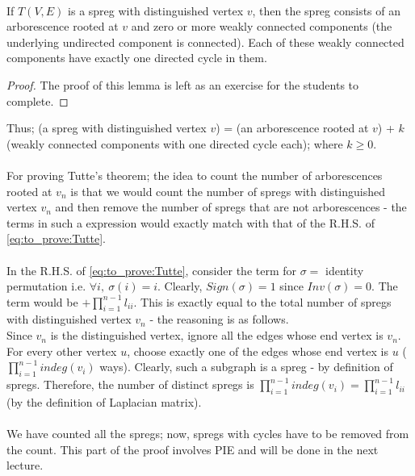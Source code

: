\noindent\\
\begin{lemma} If $T(V,E)$ is a spreg with distinguished vertex $v$, then the spreg consists of an arborescence rooted at $v$ and zero or more weakly connected components (the underlying undirected component is connected). Each of these weakly connected components have exactly one directed cycle in them.
\end{lemma}
\begin{proof}
The proof of this lemma is left as an exercise for the students to complete.
\end{proof}
\noindent Thus; (a spreg  with distinguished vertex $v$) = (an arborescence rooted at $v$) + $k$ (weakly connected components with one directed cycle each); where $k \geq 0$. \\
\noindent\\
For proving Tutte's theorem; the idea to count the number of arborescences rooted at $v_n$ is that we would count the number of spregs with distinguished vertex $v_n$ and then remove the number of spregs that are not arborescences - the terms in such a expression would exactly match with that of the R.H.S. of \ref{eq:to_prove:Tutte}.\\
\noindent\\
In the R.H.S. of \ref{eq:to_prove:Tutte}, consider the term for $\sigma =$ identity permutation i.e. $\forall i,~ \sigma(i)=i$. Clearly, $Sign(\sigma)=1$ since $Inv(\sigma)=0$. The term would be $+ \prod_{i=1}^{n-1}l_{ii}$. This is exactly equal to the total number of spregs with distinguished vertex $v_n$ - the reasoning is as follows.\\
Since $v_n$ is the distinguished vertex, ignore all the edges whose end vertex is $v_n$. For every other vertex $u$, choose exactly one of the edges whose end vertex is $u$ ($\prod_{i=1}^{n-1}indeg(v_i)$ ways). Clearly, such a subgraph is a spreg - by definition of spregs. Therefore, the number of distinct spregs is $\prod_{i=1}^{n-1}indeg(v_i) = \prod_{i=1}^{n-1}l_{ii}$ (by the definition of Laplacian matrix). \\
\noindent\\
We have counted all the spregs; now, spregs with cycles have to be removed from the count. This part of the proof involves PIE and will be done in the next lecture.

